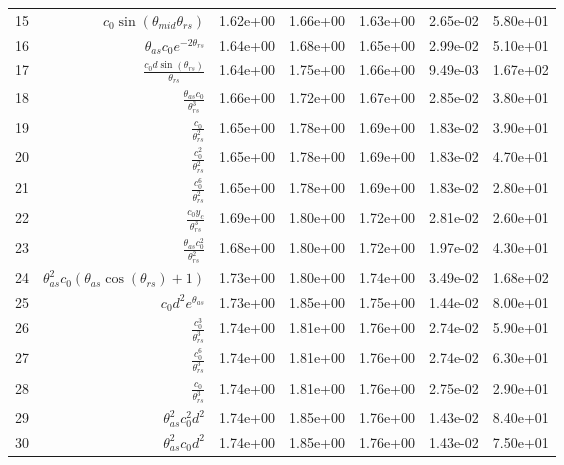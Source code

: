\begin{tabularx}{\textwidth}{lRRRRRl}
15  &  $ c_{0} \sin{\left(\theta_{mid} \theta_{rs} \right)} $  &  1.62e+00  &  1.66e+00  &  1.63e+00  &  2.65e-02  &  5.80e+01  \\ 
16  &  $ \theta_{as} c_{0} e^{- 2 \theta_{rs}} $  &  1.64e+00  &  1.68e+00  &  1.65e+00  &  2.99e-02  &  5.10e+01  \\ 
17  &  $ \displaystyle\frac{c_{0} d \sin{\left(\theta_{rs} \right)}}{\theta_{rs}} $  &  1.64e+00  &  1.75e+00  &  1.66e+00  &  9.49e-03  &  1.67e+02  \\ 
18  &  $ \displaystyle\frac{\theta_{as} c_{0}}{\theta_{rs}^{3}} $  &  1.66e+00  &  1.72e+00  &  1.67e+00  &  2.85e-02  &  3.80e+01  \\ 
19  &  $ \displaystyle\frac{c_{0}}{\theta_{rs}^{2}} $  &  1.65e+00  &  1.78e+00  &  1.69e+00  &  1.83e-02  &  3.90e+01  \\ 
20  &  $ \displaystyle\frac{c_{0}^{2}}{\theta_{rs}^{2}} $  &  1.65e+00  &  1.78e+00  &  1.69e+00  &  1.83e-02  &  4.70e+01  \\ 
21  &  $ \displaystyle\frac{c_{0}^{6}}{\theta_{rs}^{2}} $  &  1.65e+00  &  1.78e+00  &  1.69e+00  &  1.83e-02  &  2.80e+01  \\ 
22  &  $ \displaystyle\frac{c_{0} y_c}{\theta_{rs}^{3}} $  &  1.69e+00  &  1.80e+00  &  1.72e+00  &  2.81e-02  &  2.60e+01  \\ 
23  &  $ \displaystyle\frac{\theta_{as} c_{0}^{2}}{\theta_{rs}^{2}} $  &  1.68e+00  &  1.80e+00  &  1.72e+00  &  1.97e-02  &  4.30e+01  \\ 
24  &  $ \theta_{as}^{2} c_{0} \left(\theta_{as} \cos{\left(\theta_{rs} \right)} + 1\right) $  &  1.73e+00  &  1.80e+00  &  1.74e+00  &  3.49e-02  &  1.68e+02  \\ 
25  &  $ c_{0} d^{2} e^{\theta_{as}} $  &  1.73e+00  &  1.85e+00  &  1.75e+00  &  1.44e-02  &  8.00e+01  \\ 
26  &  $ \displaystyle\frac{c_{0}^{3}}{\theta_{rs}^{3}} $  &  1.74e+00  &  1.81e+00  &  1.76e+00  &  2.74e-02  &  5.90e+01  \\ 
27  &  $ \displaystyle\frac{c_{0}^{6}}{\theta_{rs}^{3}} $  &  1.74e+00  &  1.81e+00  &  1.76e+00  &  2.74e-02  &  6.30e+01  \\ 
28  &  $ \displaystyle\frac{c_{0}}{\theta_{rs}^{3}} $  &  1.74e+00  &  1.81e+00  &  1.76e+00  &  2.75e-02  &  2.90e+01  \\ 
29  &  $ \theta_{as}^{2} c_{0}^{2} d^{2} $  &  1.74e+00  &  1.85e+00  &  1.76e+00  &  1.43e-02  &  8.40e+01  \\ 
30  &  $ \theta_{as}^{2} c_{0} d^{2} $  &  1.74e+00  &  1.85e+00  &  1.76e+00  &  1.43e-02  &  7.50e+01  \\ 

\end{tabularx}
